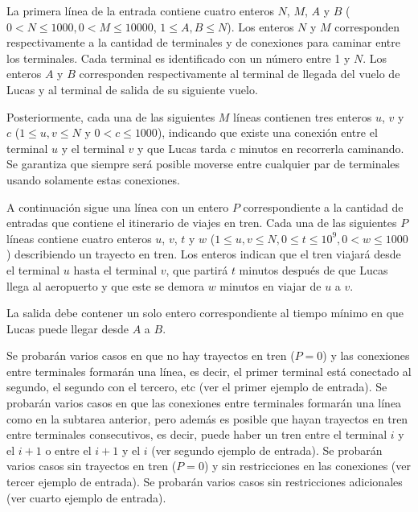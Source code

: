 \documentclass{oci}
\begin{document}
\begin{inputDescription}
  La primera línea de la entrada contiene cuatro enteros $N$, $M$, $A$ y $B$
  ($0 < N\leq 1000, 0 < M \leq 10000$, $1 \leq A, B\leq N$).
  Los enteros $N$ y $M$ corresponden respectivamente a la cantidad de terminales
  y de conexiones para caminar entre los terminales.
  Cada terminal es identificado con un número entre 1 y $N$.
  Los enteros $A$ y $B$ corresponden respectivamente al terminal de llegada del vuelo de Lucas 
  y al terminal de salida de su siguiente vuelo.

  Posteriormente, cada una de las siguientes $M$ líneas contienen tres enteros
  $u$, $v$ y $c$ ($1\leq u, v\leq N$ y $0<c\leq 1000$), indicando que existe una
  conexión entre el terminal $u$ y el terminal $v$ y que Lucas tarda $c$ minutos
  en recorrerla caminando.
  Se garantiza que siempre será posible moverse entre cualquier par de
  terminales usando solamente estas conexiones.

  A continuación sigue una línea con un entero $P$ correspondiente a la
  cantidad de entradas que contiene el itinerario de viajes en tren.
  Cada una de las siguientes $P$ líneas contiene cuatro enteros $u$, $v$,
  $t$ y $w$ ($1 \leq u,v \leq N, 0\leq t\leq 10^9, 0 < w \leq 1000$)
  describiendo un trayecto en tren. 
  Los enteros indican que el tren viajará desde el terminal $u$ hasta el
  terminal $v$, que partirá $t$ minutos después de que Lucas llega al aeropuerto
  y que este se demora $w$ minutos en viajar de $u$ a $v$.
\end{inputDescription}

\begin{outputDescription}
  La salida debe contener un solo entero correspondiente al tiempo mínimo en que
  Lucas puede llegar desde $A$ a $B$.
\end{outputDescription}

\begin{scoreDescription}
   Se probarán varios casos en que no hay trayectos en tren ($P=0$) y
  las conexiones entre terminales formarán una línea, es decir, el primer
  terminal está conectado al segundo, el segundo con el tercero, etc (ver
  el primer ejemplo de entrada). 
   Se probarán varios casos en que las conexiones entre terminales formarán una línea 
  como en la subtarea anterior, pero además es posible que hayan
  trayectos en tren entre terminales consecutivos, es decir, puede haber un
  tren entre el terminal $i$ y el $i+1$ o entre el $i+1$ y el $i$ (ver segundo
  ejemplo de entrada).
   Se probarán varios casos sin trayectos en tren ($P=0$) y sin
  restricciones en las conexiones (ver tercer ejemplo de entrada).
   Se probarán varios casos sin restricciones adicionales (ver cuarto
  ejemplo de entrada).
\end{scoreDescription}

\begin{sampleDescription}
\end{sampleDescription}
\end{document}
